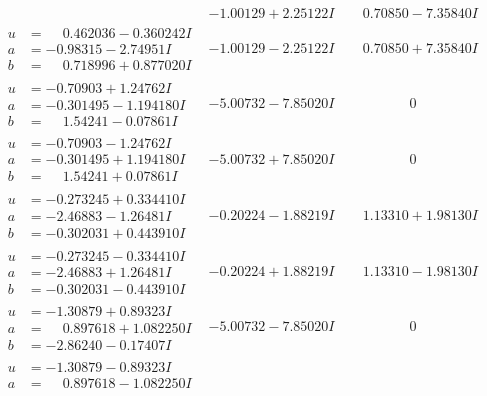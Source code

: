 \documentclass[1p]{elsarticle_modified}
\theoremstyle{definition}
\begin{document}
$$\begin{array}{c|c|c}
 & -1.00129 + 2.25122 I & \phantom{-}0.70850 - 7.35840 I \\ \hline\begin{aligned}
u &= \phantom{-}0.462036 - 0.360242 I \\
a &= -0.98315 - 2.74951 I \\
b &= \phantom{-}0.718996 + 0.877020 I\end{aligned}
 & -1.00129 - 2.25122 I & \phantom{-}0.70850 + 7.35840 I \\ \hline\begin{aligned}
u &= -0.70903 + 1.24762 I \\
a &= -0.301495 - 1.194180 I \\
b &= \phantom{-}1.54241 - 0.07861 I\end{aligned}
 & -5.00732 - 7.85020 I & \phantom{-0.000000 } 0 \\ \hline\begin{aligned}
u &= -0.70903 - 1.24762 I \\
a &= -0.301495 + 1.194180 I \\
b &= \phantom{-}1.54241 + 0.07861 I\end{aligned}
 & -5.00732 + 7.85020 I & \phantom{-0.000000 } 0 \\ \hline\begin{aligned}
u &= -0.273245 + 0.334410 I \\
a &= -2.46883 - 1.26481 I \\
b &= -0.302031 + 0.443910 I\end{aligned}
 & -0.20224 - 1.88219 I & \phantom{-}1.13310 + 1.98130 I \\ \hline\begin{aligned}
u &= -0.273245 - 0.334410 I \\
a &= -2.46883 + 1.26481 I \\
b &= -0.302031 - 0.443910 I\end{aligned}
 & -0.20224 + 1.88219 I & \phantom{-}1.13310 - 1.98130 I \\ \hline\begin{aligned}
u &= -1.30879 + 0.89323 I \\
a &= \phantom{-}0.897618 + 1.082250 I \\
b &= -2.86240 - 0.17407 I\end{aligned}
 & -5.00732 - 7.85020 I & \phantom{-0.000000 } 0 \\ \hline\begin{aligned}
u &= -1.30879 - 0.89323 I \\
a &= \phantom{-}0.897618 - 1.082250 I \\

\end{aligned}
\end{array}$$
\end{document}
